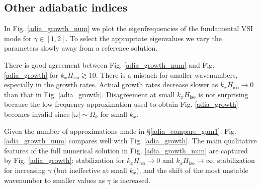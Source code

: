 \subsection{Other adiabatic indices}
In Fig. \ref{adia_growth_num} we plot the eigenfrequencies of the
fundamental VSI mode for $\gamma\in[1,2]$. To select the appropriate
eigenvalues we vary the parameters slowly away from a reference solution.   

There is good agreement between Fig. \ref{adia_growth_num} and
Fig. \ref{adia_growth} for $k_xH_\mathrm{iso}\gtrsim10$. There is a
mistach for smaller wavenumbers, especially in the growth
rates. Actual growth rates decrease slower as $k_xH_\mathrm{iso}\to0$
than that in Fig. \ref{adia_growth}. Disagreement at small
$k_xH_\mathrm{iso}$ is not surprising because the low-frequency
approximation used to obtain Fig. \ref{adia_growth} becomes invalid since
$|\omega|\sim\Omega_k$ for small $k_x$. 

Given the number of approximations made in \S\ref{adia_compare_gam1},
Fig. \ref{adia_growth_num} compares well with
Fig. \ref{adia_growth}. The main qualitative features of the full
numerical solution in Fig. \ref{adia_growth_num} are captured by
Fig. \ref{adia_growth}: stabilization for
$k_xH_\mathrm{iso}\to0$ and $k_xH_\mathrm{iso}\to\infty$,
stabilization for increasing $\gamma$ (but ineffective at small $k_x$), 
and the shift of the most unstable wavenumber to smaller values as
$\gamma$ is increased. 


